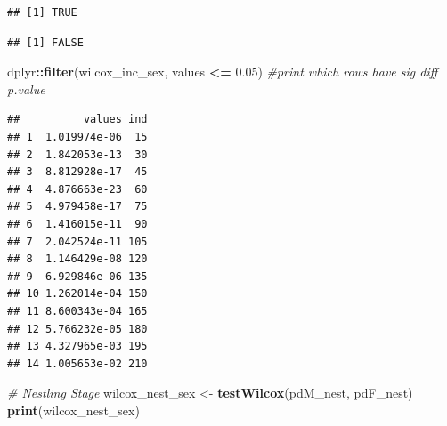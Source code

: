 \documentclass[]{article}
\newenvironment{Shaded}{\begin{snugshade}}{\end{snugshade}}
\newcommand{\CommentTok}[1]{\textcolor[rgb]{0.56,0.35,0.01}{\textit{#1}}}
\newcommand{\FloatTok}[1]{\textcolor[rgb]{0.00,0.00,0.81}{#1}}
\newcommand{\KeywordTok}[1]{\textcolor[rgb]{0.13,0.29,0.53}{\textbf{#1}}}
\newcommand{\NormalTok}[1]{#1}
\newcommand{\OperatorTok}[1]{\textcolor[rgb]{0.81,0.36,0.00}{\textbf{#1}}}
\newcommand{\StringTok}[1]{\textcolor[rgb]{0.31,0.60,0.02}{#1}}
\begin{document}
\begin{Shaded}
\end{Shaded}

\begin{verbatim}
## [1] TRUE
\end{verbatim}

\begin{Shaded}
\end{Shaded}

\begin{verbatim}
## [1] FALSE
\end{verbatim}

\begin{Shaded}
\begin{Highlighting}[]
\NormalTok{dplyr}\OperatorTok{::}\KeywordTok{filter}\NormalTok{(wilcox_inc_sex, values }\OperatorTok{<=}\StringTok{ }\FloatTok{0.05}\NormalTok{) }\CommentTok{#print which rows have sig diff p.value }
\end{Highlighting}
\end{Shaded}

\begin{verbatim}
##          values ind
## 1  1.019974e-06  15
## 2  1.842053e-13  30
## 3  8.812928e-17  45
## 4  4.876663e-23  60
## 5  4.979458e-17  75
## 6  1.416015e-11  90
## 7  2.042524e-11 105
## 8  1.146429e-08 120
## 9  6.929846e-06 135
## 10 1.262014e-04 150
## 11 8.600343e-04 165
## 12 5.766232e-05 180
## 13 4.327965e-03 195
## 14 1.005653e-02 210
\end{verbatim}

\begin{Shaded}
\begin{Highlighting}[]
\CommentTok{# Nestling Stage}
\NormalTok{wilcox_nest_sex <-}\StringTok{ }\KeywordTok{testWilcox}\NormalTok{(pdM_nest, pdF_nest)}
\KeywordTok{print}\NormalTok{(wilcox_nest_sex)}
\end{Highlighting}
\end{Shaded}
\end{document}
